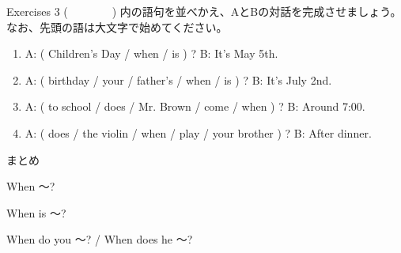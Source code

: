 \documentclass[aspectratio=169]{beamer}
\begin{document}
\begin{frame}[plain]{Exercises 3}
 (~~~~~~~~) 内の語句を並べかえ、AとBの対話を完成させましょう。なお、先頭の語は大文字で始めてください。

\begin{enumerate}
 \item A: ( Children's Day / when / is ) ? 
\hspace{137.4pt}B: It's May 5th.\\
\phantom{A: }
 \item A: ( birthday / your / father's / when / is ) ?
\hspace{83.5pt}B: It's July 2nd.\\
\phantom{A: }
 \item A: ( to school / does / Mr. Brown / come / when ) ?
\hspace{47pt}B: Around 7:00.\\
\phantom{A: }
 \item A: ( does / the violin / when / play / your brother ) ?
\hspace{39.7pt}B: After dinner.\\
\phantom{A: }
\end{enumerate}
\end{frame}
\begin{frame}[plain]{まとめ}
 \begin{block}{When ～?}
\begin{description}[　　　　]
 \item[be動詞] When is ～?
 \item[一般動詞] When do you ～? / When does he ～?
\end{description}
  
 \end{block}
\end{frame}
\end{document}
